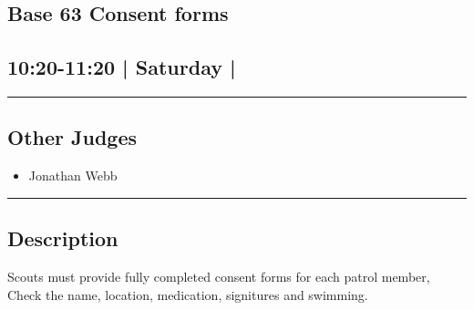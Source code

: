 \documentclass[10pt, A5]{article}
\begin{document}
	

		\begin{framed}
			\begin{minipage}{\textwidth}

			\setcounter{section}{18}
							\section{\faStar \: Base 63 \faStar \: Consent forms}
						
			\subsection*{10:20-11:20 | Saturday | }

			\vspace{0.25cm}
			\hrule
			\vspace{0.25cm}


			\subsection*{Other Judges}
							

				\begin{multicols}{2}

			\begin{itemize}
											\item Jonathan Webb
								\end{itemize}

			\vfill\null
			\columnbreak

			\begin{itemize}
								\end{itemize}

			\vfill\null

			\end{multicols}

			\vspace{0.25cm}
			\hrule
			\vspace{0.25cm}

			\begin{minipage}{\textwidth}
			\subsection*{\faListAlt \: Description}
			Scouts must provide fully completed consent forms for each patrol member, Check the name, location, medication, signitures and swimming.
			\end{minipage}


	\end{minipage}
	\end{framed}
\end{document}
